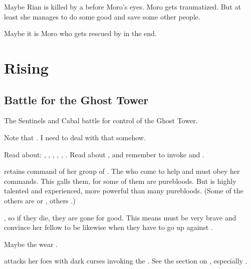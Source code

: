 Maybe Rian is killed by a \bane before Moro's eyes. 
Moro gets traumatized. 
But at least she manages to do some good and save some other people. 

Maybe it is Moro who gets rescued by \Criseis in the end. 















\section{\Nithdornazsh Rising}







\subsection{Battle for the Ghost Tower}
The Sentinels and Cabal battle for control of the Ghost Tower. 

Note that . 
I need to deal with that somehow. 

Read about: 
  ,
  ,
  ,
  ,
  ,
  . 
Read about , and remember to invoke \Sethicus and \Tiamat. 

\Achsah retains command of her group of \resphain. 
The \resphain who come to help \Achsah {} and must obey her commands. 
This galls them, for some of them are purebloods. 
But \Achsah is highly talented and experienced, more powerful than many purebloods.
(Some of the others are \thelyadeth or \gessurim, others \bezedeth.)

, so if they die, they are gone for good. 
This means \Achsah must be very brave and convince her fellow \bezedeth to be likewise when they have to go up against \Nzessuacrith.
    
Maybe the \resphain wear .

\Nzessuacrith attacks her foes with dark curses invoking the \xss. 
See the section on , especially .





